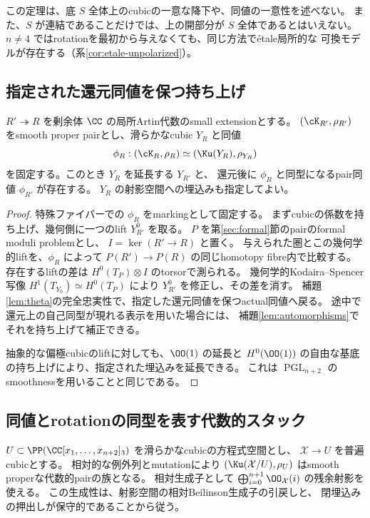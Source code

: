 この定理は、底 \(S\) 全体上のcubicの一意な降下や、同値の一意性を述べない。
また、\(S\) が連結であることだけでは、上の開部分が \(S\) 全体であるとはいえない。
\(n\ne4\) ではrotationを最初から与えなくても、同じ方法でétale局所的な
可換モデルが存在する（系\ref{cor:etale-unpolarized}）。

\subsection{指定された還元同値を保つ持ち上げ}

\begin{lemma}\label{lem:relative-realization}
 \(R'\twoheadrightarrow R\) を剰余体 \(\CC\) の局所Artin代数のsmall extensionとする。
 \((\cK_{R'},\rho_{R'})\) をsmooth proper pairとし、滑らかなcubic \(Y_R\) と同値
 \[
 \phi_R:(\cK_R,\rho_R)\simeq(\Ku(Y_R),\rho_{Y_R})
 \]
 を固定する。このとき \(Y_R\) を延長する \(Y_{R'}\) と、
 還元後に \(\phi_R\) と同型になるpair同値 \(\phi_{R'}\) が存在する。
 \(Y_R\) の射影空間への埋込みも指定してよい。
\end{lemma}
\begin{proof}
 特殊ファイバーでの \(\phi_R\) をmarkingとして固定する。
 まずcubicの係数を持ち上げ、幾何側に一つのlift \(Y^0_{R'}\) を取る。
 \(P\) を第\ref{sec:formal}節のpairのformal moduli problemとし、
 \(I=\ker(R'\to R)\) と置く。
 与えられた圏とこの幾何学的liftを、\(\phi_R\) によって
 \(P(R')\to P(R)\) の同じhomotopy fibre内で比較する。
 存在するliftの差は \(H^0(T_P)\otimes I\) のtorsorで測られる。
 幾何学的Kodaira--Spencer写像
 \(H^1(T_{Y_0})\simeq H^0(T_P)\) により \(Y^0_{R'}\) を修正し、その差を消す。
 補題\ref{lem:theta}の完全忠実性で、指定した還元同値を保つactual同値へ戻る。
 途中で還元上の自己同型が現れる表示を用いた場合には、
 補題\ref{lem:automorphisms}でそれを持ち上げて補正できる。

 抽象的な偏極cubicのliftに対しても、\(\OO(1)\) の延長と
 \(H^0(\OO(1))\) の自由な基底の持ち上げにより、指定された埋込みを延長できる。
 これは \(\operatorname{PGL}_{n+2}\) のsmoothnessを用いることと同じである。
\end{proof}

\subsection{同値とrotationの同型を表す代数的スタック}

\(U\subset\PP(\CC[x_1,\ldots,x_{n+2}]_3)\) を滑らかなcubicの方程式空間とし、
 \(\mathcal X\to U\) を普遍cubicとする。
 相対的な例外列とmutationにより
 \((\Ku(\mathcal X/U),\rho_U)\) はsmooth properな代数的pairの族となる。
 相対生成子として \(\bigoplus_{i=0}^{n+1}\OO_{\mathcal X}(i)\) の残余射影を使える。
 この生成性は、射影空間の相対Beilinson生成子の引戻しと、
 閉埋込みの押出しが保守的であることから従う。

